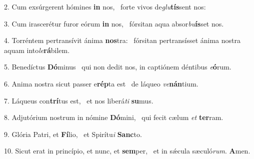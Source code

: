 2. Cum exsúrgerent hómines \textbf{in} nos, \ast\  forte vivos de\textit{glu}\textbf{tís}sent nos:\

3. Cum irascerétur furor eórum \textbf{in} nos, \ast\  fórsitan aqua absor\textit{bu}\textbf{ís}set nos.\

4. Torréntem pertransívit ánima \textbf{nos}tra: \ast\  fórsitan pertransísset ánima nostra aquam into\textit{le}\textbf{rá}bilem.\

5. Benedíctus \textbf{Dó}minus \ast\  qui non dedit nos, in captiónem déntibus \textit{e}\textbf{ó}rum.\

6. Anima nostra sicut passer e\textbf{rép}ta est \ast\  de láqueo \textit{ve}\textbf{nán}tium.\

7. Láqueus con\textbf{trí}tus est, \ast\  et nos liberá\textit{ti} \textbf{su}mus.\

8. Adjutórium nostrum in nómine \textbf{Dó}mini, \ast\  qui fecit cælum \textit{et} \textbf{ter}ram.\

9. Glória Patri, et \textbf{Fí}lio, \ast\  et Spirítu\textit{i} \textbf{Sanc}to.\

10. Sicut erat in princípio, et nunc, et \textbf{sem}per, \ast\  et in sǽcula sæculó\textit{rum}. \textbf{A}men.\

